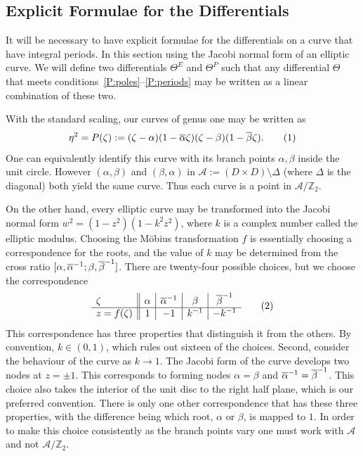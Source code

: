 \documentclass{article}
\begin{document}
\subsection{Explicit Formulae for the Differentials}\label{sub:Differentials}
It will be necessary to have explicit formulae for the differentials on a curve that have integral periods. In this section using the Jacobi normal form of an elliptic curve. We will define two differentials $\Theta^E$ and $\Theta^P$ such that any differential $\Theta$ that meets conditions~\ref{P:poles}--\ref{P:periods} may be written as a linear combination of these two.

With the standard scaling, our curves of genus one may be written as
\[
\eta^2 = P(\zeta) := (\zeta-\alpha)(1-\bar{\alpha}\zeta)(\zeta-\beta)(1-\bar{\beta}\zeta).
\labelthis{eqn:genus one curve}
\]
One can equivalently identify this curve with its branch points $\alpha,\beta$ inside the unit circle. However $(\alpha, \beta)$ and $(\beta,\alpha)$ in $\mathcal{A} := (D \times D) \setminus \Delta$ (where $\Delta$ is the diagonal) both yield the same curve. Thus each curve is a point in $\mathcal{A}/\mathbb{Z}_2$. 

On the other hand, every elliptic curve may be transformed into the Jacobi normal form $w^2 = (1-z^2)(1-k^2z^2)$, where $k$ is a complex number called the elliptic modulus. 
Choosing the M\"obius transformation $f$ is essentially choosing a correspondence for the roots, and the value of $k$ may be determined from the cross ratio $[\alpha,\overline{\alpha}^{-1};\beta,\overline{\beta}^{-1}]$.
There are twenty-four possible choices, but we choose the correspondence
\[
  \begin{array}{ l||c|c|c|c}
    \zeta & \alpha & \cji{\alpha} & \beta & \cji{\beta} \\
    \hline
    z = f(\zeta) & 1 & -1 & k^{-1} & -k^{-1}
  \end{array}
  \labelthis{eqn:choice f}
\]
This correspondence has three properties that distinguish it from the others. By convention, $k \in (0,1)$, which rules out sixteen of the choices. Second, consider the behaviour of the curve as $k\to 1$. The Jacobi form of the curve develops two nodes at $z=\pm 1$. This corresponds to forming nodes $\alpha=\beta$ and $\overline{\alpha}^{-1} = \overline{\beta}^{-1}$. This choice also takes the interior of the unit disc to the right half plane, which is our preferred convention. There is only one other correspondence that has these three properties, with the difference being which root, $\alpha$ or $\beta$, is mapped to $1$. In order to make this choice consistently as the branch points vary one must work with $\mathcal{A}$ and not $\mathcal{A}/\mathbb{Z}_2$.
\end{document}
